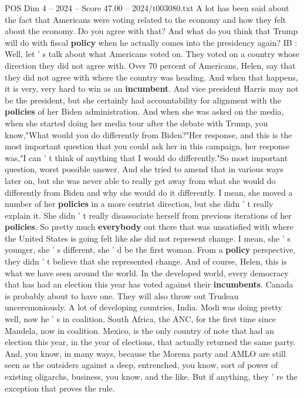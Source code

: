 \begin{textsample}{POS Dim 4 – 2024 – Score 47.00 – 2024/t003080.txt}
A lot has been said about the fact that Americans were voting related to the economy and how they felt about the economy.
Do you agree with that?
And what do you think that Trump will do with fiscal \textbf{policy} when he actually comes into the presidency again?
IB : Well, let ' s talk about what Americans voted on.
They voted on a country whose direction they did not agree with.
Over 70 percent of Americans, Helen, say that they did not agree with where the country was heading.
And when that happens, it is very, very hard to win as an \textbf{incumbent}.
And vice president Harris may not be the president, but she certainly had accountability for alignment with the \textbf{policies} of her Biden administration.
And when she was asked on the media, when she started doing her media tour after the debate with Trump, you know,"What would you do differently from Biden?"Her response, and this is the most important question that you could ask her in this campaign, her response was,"I can ' t think of anything that I would do differently."So most important question, worst possible answer.
And she tried to amend that in various ways later on, but she was never able to really get away from what she would do differently from Biden and why she would do it differently.
I mean, she moved a number of her \textbf{policies} in a more centrist direction, but she didn ' t really explain it.
She didn ' t really disassociate herself from previous iterations of her \textbf{policies}.
So pretty much \textbf{everybody} out there that was unsatisfied with where the United States is going felt like she did not represent change.
I mean, she ' s younger, she ' s different, she ' d be the first woman.
From a \textbf{policy} perspective, they didn ' t believe that she represented change.
And of course, Helen, this is what we have seen around the world.
In the developed world, every democracy that has had an election this year has voted against their \textbf{incumbents}.
Canada is probably about to have one.
They will also throw out Trudeau unceremoniously.
A lot of developing countries, India.
Modi was doing pretty well, now he ' s in coalition.
South Africa, the ANC, for the first time since Mandela, now in coalition.
Mexico, is the only country of note that had an election this year, in the year of elections, that actually returned the same party.
And, you know, in many ways, because the Morena party and AMLO are still seen as the outsiders against a deep, entrenched, you know, sort of power of existing oligarchs, business, you know, and the like.
But if anything, they ' re the exception that proves the rule.

\end{textsample}
